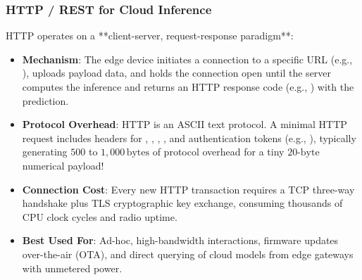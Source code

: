 \subsubsection{HTTP / REST for Cloud Inference}
HTTP operates on a **client-server, request-response paradigm**:
\begin{itemize}
    \item \textbf{Mechanism}: The edge device initiates a connection to a specific URL (e.g., ), uploads payload data, and holds the connection open until the server computes the inference and returns an HTTP response code (e.g., ) with the prediction.
    \item \textbf{Protocol Overhead}: HTTP is an ASCII text protocol. A minimal HTTP request includes headers for , , , , and authentication tokens (e.g., ), typically generating $500$ to $1{,}000\,\text{bytes}$ of protocol overhead for a tiny $20\text{-byte}$ numerical payload!
    \item \textbf{Connection Cost}: Every new HTTP transaction requires a TCP three-way handshake plus TLS cryptographic key exchange, consuming thousands of CPU clock cycles and radio uptime.
    \item \textbf{Best Used For}: Ad-hoc, high-bandwidth interactions, firmware updates over-the-air (OTA), and direct querying of cloud models from edge gateways with unmetered power.
\end{itemize}

